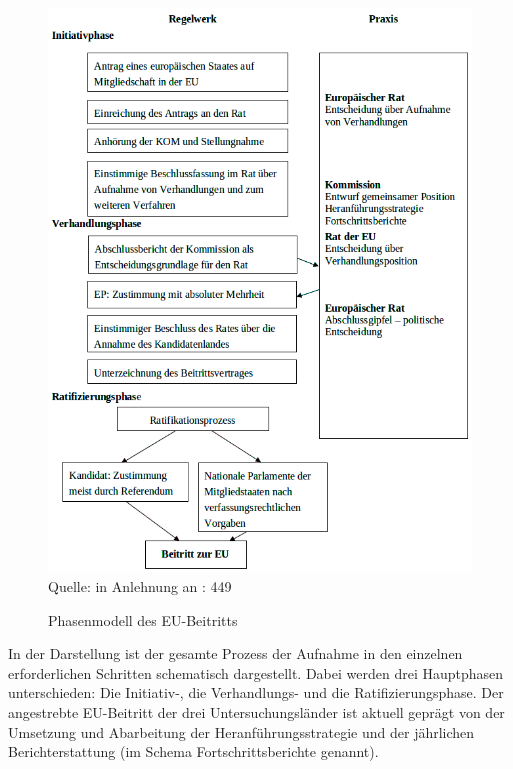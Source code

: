 \begin{figure}[H]
  \centering

   \caption{Phasenmodell des EU-Beitritts }
  \includegraphics[width=5in]{Material/Phasenmodell_ohneRand}\\

Quelle: in Anlehnung an \cite{wessels} : 449
\end{figure}
In der Darstellung ist der gesamte Prozess der Aufnahme in den einzelnen erforderlichen Schritten schematisch dargestellt. Dabei werden drei Hauptphasen unterschieden: Die Initiativ-, die Verhandlungs- und die Ratifizierungsphase. Der angestrebte EU-Beitritt der drei Untersuchungsländer ist aktuell geprägt von der Umsetzung und Abarbeitung der Heranführungsstrategie und der jährlichen Berichterstattung (im Schema Fortschrittsberichte genannt).\par

